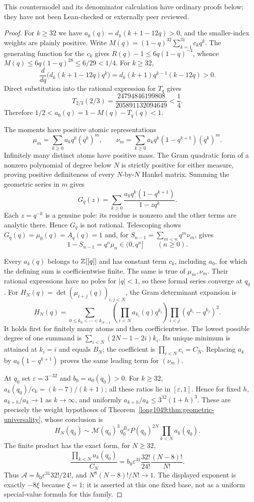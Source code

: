 \documentclass[11pt]{article}
\begin{document}
This countermodel and its denominator calculation have ordinary proofs
below; they have not been Lean-checked or externally peer reviewed.

\begin{proof}
For $k\ge32$ we have $a_k(q)=d_k(k+1-12q)>0$, and the smaller-index
weights are plainly positive.  Write
$M(q)=(1-q)^{32}\sum_{k=1}^{31}c_kq^k$.
The generating function for the $c_k$ gives
$R(q)-1\le6q(1-q)^{-4}$, whence
$M(q)\le6q(1-q)^{28}\le6/29<1/4$.
For $k\ge32$,
\[
 \frac{d}{dq}\bigl(d_k(k+1-12q)q^k\bigr)
   =d_k(k+1)q^{k-1}(k-12q)>0.
\]
Direct substitution into the rational expression for $T_q$ gives
\[
 T_{2/3}(2/3)
   =\frac{24794846199808}{205891132094649}<\frac14.
\]
Therefore $1/2<a_0(q)=1-M(q)-T_q(q)<1$.

The moments have positive atomic representations
\[
 \mu_m=\sum_{k\ge0}a_kq^k(q^k)^m,\qquad
 \nu_m=\sum_{k\ge0}a_kq^k(1-q^{k+1})(q^k)^m.
\]
Infinitely many distinct atoms have positive mass.  The Gram
quadratic form of a nonzero polynomial of degree below $N$ is strictly
positive for either measure, proving positive definiteness of every
$N$-by-$N$ Hankel matrix.  Summing the geometric series in $m$ gives
\[
 G_q(z)=\sum_{k\ge0}\frac{a_kq^k(1-q^{k+1})}{1-zq^k}.
\]
Each $z=q^{-k}$ is a genuine pole: its residue is nonzero and the other
terms are analytic there.  Hence $G_q$ is not rational.  Telescoping
shows $G_q(q)=\mu_0(q)=A_q(q)=1$ and, for
$S_{n-1}=\sum_{m<n}q^m\nu_m$, gives
\[
 1-S_{n-1}=q^n\mu_n\in(0,q^n]
 \qquad(n\ge0).
\]

Every $a_k(q)$ belongs to $\mathbb{Z}[[q]]$ and has constant term $c_k$,
including $a_0$, for which the defining sum is coefficientwise finite.
The same is true of $\mu_m,\nu_m$.  Their rational expressions have no
poles for $|q|<1$, so these formal series converge at $q_0$.
For $H_N(q)=\det(\mu_{i+j}(q))_{i,j<N}$, the Gram determinant expansion is
\[
 H_N(q)=\sum_{0\le k_0<\cdots<k_{N-1}}
     \left(\prod_{i<N}a_{k_i}(q)q^{k_i}\right)
     \prod_{i<j}(q^{k_i}-q^{k_j})^2.
\]
It holds first for finitely many atoms and then coefficientwise.
The lowest possible degree of one summand is
$\sum_{i<N}(2N-1-2i)k_i$.  Its unique minimum is attained at
$k_i=i$ and equals $B_N$; the coefficient is
$\prod_{i<N}c_i=C_N$.  Replacing $a_k$ by
$a_k(1-q^{k+1})$ proves the same leading term for $(\nu_m)$.

At $q_0$ set $\varepsilon=3^{-32}$ and $b_0=a_0(q_0)>0$.  For $k\ge32$,
$a_k(q_0)/c_k=(k-7)/(k+1)$; all these ratios lie in
$[\varepsilon,1]$.  Hence for fixed $h$,
$a_{k+h}/a_k\to1$ as $k\to\infty$, and uniformly
$a_{k+h}/a_k\le3^{32}(1+h)^3$.
These are precisely the weight hypotheses of
Theorem~\ref{long1049:thm:geometric-universality}, whose conclusion is
\[
 H_N(q_0)\sim\mathcal M(q_0)^3q_0^{B_N}P(q_0)^{2N}
                  \prod_{k<N}a_k(q_0).
\]
The finite product has the exact form, for $N\ge32$,
\[
 \frac{\prod_{k<N}a_k(q_0)}{C_N}
 =b_0\varepsilon^{31}\frac{32!}{24!}\frac{(N-8)!}{N!}.
\]
Thus $\mathcal A=b_0\varepsilon^{31}32!/24!$, and
$N^8(N-8)!/N!\to1$.  The displayed exponent is exactly $-8\xi$
because $\xi=1$; it is asserted at this one fixed base, not as a
uniform special-value formula for this family.
\end{proof}
\end{document}
